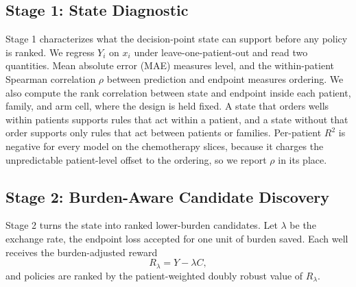 \documentclass[conference]{IEEEtran}
\begin{document}
\subsection{Stage 1: State Diagnostic}

Stage 1 characterizes what the decision-point state can support before any policy is ranked. We regress \(Y_i\) on \(x_i\) under leave-one-patient-out and read two quantities. Mean absolute error (MAE) measures level, and the within-patient Spearman correlation \(\rho\) between prediction and endpoint measures ordering. We also compute the rank correlation between state and endpoint inside each patient, family, and arm cell, where the design is held fixed. A state that orders wells within patients supports rules that act within a patient, and a state without that order supports only rules that act between patients or families. Per-patient \(R^2\) is negative for every model on the chemotherapy slices, because it charges the unpredictable patient-level offset to the ordering, so we report \(\rho\) in its place.

\subsection{Stage 2: Burden-Aware Candidate Discovery}

Stage 2 turns the state into ranked lower-burden candidates. Let \(\lambda\) be the exchange rate, the endpoint loss accepted for one unit of burden saved. Each well receives the burden-adjusted reward
\begin{equation}
R_{\lambda}=Y-\lambda C,
\end{equation}
and policies are ranked by the patient-weighted doubly robust value of \(R_\lambda\).
\end{document}
